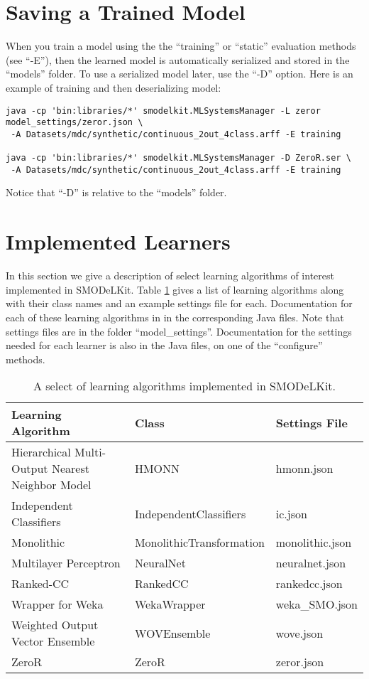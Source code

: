 \documentclass[twoside,11pt]{article}
\begin{document}
\section{Saving a Trained Model}

When you train a model using the the ``training'' or ``static'' evaluation methods (see ``-E''), then the learned model is automatically serialized and stored in the ``models'' folder. To use a serialized model later, use the ``-D'' option. Here is an example of training and then deserializing model:

\clearpage
\begin{lstlisting}[frame=single]
java -cp 'bin:libraries/*' smodelkit.MLSystemsManager -L zeror model_settings/zeror.json \
 -A Datasets/mdc/synthetic/continuous_2out_4class.arff -E training

java -cp 'bin:libraries/*' smodelkit.MLSystemsManager -D ZeroR.ser \
 -A Datasets/mdc/synthetic/continuous_2out_4class.arff -E training
\end{lstlisting}

Notice that ``-D'' is relative to the ``models'' folder.

\section{Implemented Learners}

In this section we give a description of select learning algorithms of interest implemented in SMODeLKit. Table \ref{implemented_learners} gives a list of learning algorithms along with their class names and an example settings file for each. Documentation for each of these learning algorithms in in the corresponding Java files. Note that settings files are in the folder ``model\_settings''. Documentation for the settings needed for each learner is also in the Java files, on one of the ``configure'' methods.

\begin{table}
\begin{center}
    \begin{tabular}{ l l l}
    \hline
Learning Algorithm & Class & Settings File \\ \hline
Hierarchical Multi-Output Nearest Neighbor Model & HMONN & hmonn.json \\
Independent Classifiers & IndependentClassifiers & ic.json \\
Monolithic & MonolithicTransformation &  monolithic.json \\
Multilayer Perceptron & NeuralNet & neuralnet.json \\
Ranked-CC & RankedCC & rankedcc.json \\
Wrapper for Weka & WekaWrapper & weka\_SMO.json \\
Weighted Output Vector Ensemble & WOVEnsemble & wove.json \\ 
ZeroR & ZeroR & zeror.json \\
    \hline
    \end{tabular}
\caption{A select of learning algorithms implemented in SMODeLKit.}
\label{implemented_learners}
\end{center}
\end{table}
\end{document}
